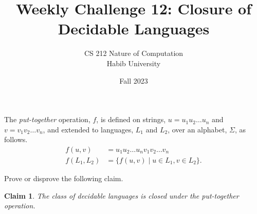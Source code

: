\documentclass[a4paper]{exam}
\title{Weekly Challenge 12: Closure of Decidable Languages}
\author{CS 212 Nature of Computation\\Habib University}
\date{Fall 2023}
\theoremstyle{theorem}
\theoremstyle{claim}
\newtheorem{claim}{Claim}
\begin{document}
\maketitle

\begin{questions}


  The \textit{put-together} operation, $f$, is defined on strings, $u=u_1u_2\ldots u_n$ and $v=v_1v_2\ldots v_n$, and extended to languages, $L_1$ and $L_2$, over an alphabet, $\Sigma$, as follows.
  \begin{align*}
    f(u,v) & = u_1u_2\ldots u_nv_1v_2\ldots v_n\\
    f(L_1, L_2) & = \{ f(u,v) \mid u\in L_1, v\in L_2 \}.
  \end{align*}
  
  Prove or disprove the following claim.
   \begin{claim}
     The class of decidable languages is closed under the put-together operation.
   \end{claim}
   
  
\end{questions}
\end{document}
